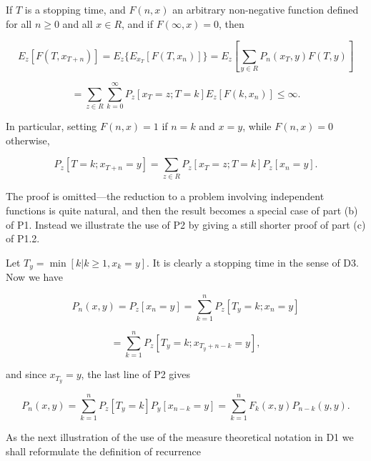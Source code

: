 If $T$ is a stopping time, and $F(n,x)$ an arbitrary non-negative function defined for all $n \geq 0$ and all $x \in R$, and if $F(\infty, x) = 0$, then

$$E_z[F(T, x_{T+n})] = E_z\{E_{x_T}[F(T, x_n)]\} = E_z[\sum_{y \in R} P_n(x_T, y)F(T, y)]$$

$$= \sum_{z \in R} \sum_{k=0}^{\infty} P_z[x_T = z; T = k]E_z[F(k, x_n)] \leq \infty.$$

In particular, setting $F(n,x) = 1$ if $n = k$ and $x = y$, while $F(n,x) = 0$ otherwise,

$$P_z[T = k; x_{T+n} = y] = \sum_{z \in R} P_z[x_T = z; T = k]P_z[x_n = y].$$

The proof is omitted—the reduction to a problem involving independent functions is quite natural, and then the result becomes a special case of part (b) of P1. Instead we illustrate the use of P2 by giving a still shorter proof of part (c) of P1.2.

Let $T_y = \min[k | k \geq 1, x_k = y]$. It is clearly a stopping time in the sense of D3. Now we have

$$P_n(x,y) = P_z[x_n = y] = \sum_{k=1}^{n} P_z[T_y = k; x_n = y]$$

$$= \sum_{k=1}^{n} P_z[T_y = k; x_{T_y+n-k} = y],$$

and since $x_{T_y} = y$, the last line of P2 gives

$$P_n(x,y) = \sum_{k=1}^{n} P_z[T_y = k]P_y[x_{n-k} = y] = \sum_{k=1}^{n} F_k(x,y)P_{n-k}(y,y).$$

As the next illustration of the use of the measure theoretical notation in D1 we shall reformulate the definition of recurrence